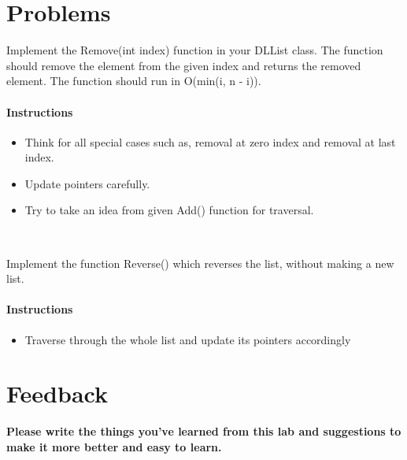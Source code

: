 \documentclass[11pt,fleqn]{book} %
\begin{document}
\section{Problems}
\begin{problem}
	Implement the Remove(int index) function in your DLList class. The function should remove the element from the given index and returns the removed element. The function should run in O(min(i, n - i)).
	\paragraph{Instructions}
	\begin{itemize}
		\item Think for all special cases such as, removal at zero index and removal at last index.
		\item Update pointers carefully.
		\item Try to take an idea from given Add() function for traversal.
	\end{itemize}
\end{problem}
~\\
\begin{problem}
	Implement the function Reverse() which reverses the list, without making a new list.
	\paragraph{Instructions}
	\begin{itemize}
		\item Traverse through the whole list and update its pointers accordingly
	\end{itemize}
\end{problem}
\newpage
\section{Feedback}
\textbf{Please write the things you've learned from this lab and suggestions to make it more better and easy to learn.}
\end{document}
